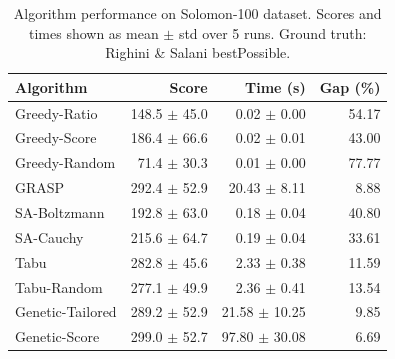 \begin{table}[htbp]
\centering
\caption{Algorithm performance on Solomon-100 dataset. Scores and times shown as mean $\pm$ std over 5 runs. Ground truth: Righini \& Salani bestPossible.}
\label{tab:results_s100}
\small
\setlength{\tabcolsep}{6pt}
\begin{tabular}{l rrr}
\toprule
\textbf{Algorithm}
& \textbf{Score} & \textbf{Time (s)} & \textbf{Gap (\%)} \\
\midrule
  Greedy-Ratio & 148.5 $\pm$ 45.0 & 0.02 $\pm$ 0.00 & 54.17 \\
  Greedy-Score & 186.4 $\pm$ 66.6 & 0.02 $\pm$ 0.01 & 43.00 \\
  Greedy-Random & 71.4 $\pm$ 30.3 & 0.01 $\pm$ 0.00 & 77.77 \\
  GRASP & 292.4 $\pm$ 52.9 & 20.43 $\pm$ 8.11 & 8.88 \\
  SA-Boltzmann & 192.8 $\pm$ 63.0 & 0.18 $\pm$ 0.04 & 40.80 \\
  SA-Cauchy & 215.6 $\pm$ 64.7 & 0.19 $\pm$ 0.04 & 33.61 \\
  Tabu & 282.8 $\pm$ 45.6 & 2.33 $\pm$ 0.38 & 11.59 \\
  Tabu-Random & 277.1 $\pm$ 49.9 & 2.36 $\pm$ 0.41 & 13.54 \\
  Genetic-Tailored & 289.2 $\pm$ 52.9 & 21.58 $\pm$ 10.25 & 9.85 \\
  Genetic-Score & 299.0 $\pm$ 52.7 & 97.80 $\pm$ 30.08 & 6.69 \\
\bottomrule
\end{tabular}
\end{table}